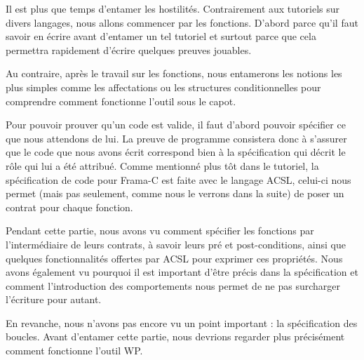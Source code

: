 
Il est plus que temps d'entamer les hostilités. Contrairement aux tutoriels 
sur divers langages, nous allons commencer par les fonctions. D'abord parce 
qu'il faut savoir en écrire avant d'entamer un tel tutoriel et surtout 
parce que cela permettra rapidement d'écrire quelques preuves jouables.



Au contraire, après le travail sur les fonctions, nous entamerons les notions 
les plus simples comme les affectations ou les structures conditionnelles pour 
comprendre comment fonctionne l'outil sous le capot.



Pour pouvoir prouver qu'un code est valide, il faut d'abord pouvoir spécifier 
ce que nous attendons de lui. La preuve de programme consistera donc à s'assurer 
que le code que nous avons écrit correspond bien à la spécification qui décrit
le rôle qui lui a été attribué. Comme mentionné plus tôt dans le tutoriel, la 
spécification de code pour Frama-C est faite avec le langage ACSL, celui-ci 
nous permet (mais pas seulement, comme nous le verrons dans la suite) de poser
un contrat pour chaque fonction.



















\horizontalLine



Pendant cette partie, nous avons vu comment spécifier les fonctions par 
l'intermédiaire de leurs contrats, à savoir leurs pré et post-conditions, ainsi
que quelques fonctionnalités offertes par ACSL pour exprimer ces propriétés. 
Nous avons également vu pourquoi il est important d'être précis dans la 
spécification et comment l'introduction des comportements nous permet de ne pas
surcharger l'écriture pour autant.



En revanche, nous n'avons pas encore vu un point important : la spécification 
des boucles. Avant d'entamer cette partie, nous devrions regarder plus 
précisément comment fonctionne l'outil WP.

